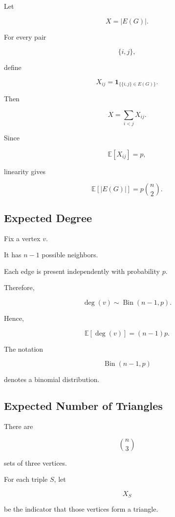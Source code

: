 Let

\[
X
=
|E(G)|.
\]

For every pair

\[
\{i,j\},
\]

define

\[
X_{ij}
=
\mathbf{1}_{\{\{i,j\}\in E(G)\}}.
\]

Then

\[
X
=
\sum_{i<j}X_{ij}.
\]

Since

\[
\mathbb{E}[X_{ij}]
=
p,
\]

linearity gives

\[
\boxed{
\mathbb{E}[|E(G)|]
=
p\binom{n}{2}.
}
\]

\subsection{Expected Degree}
\label{subsec:expected-degree-random-graph}

Fix a vertex \(v\).

It has \(n-1\) possible neighbors.

Each edge is present independently with probability \(p\).

Therefore,

\[
\deg(v)
\sim
\operatorname{Bin}(n-1,p).
\]

Hence,

\[
\boxed{
\mathbb{E}[\deg(v)]
=
(n-1)p.
}
\]

The notation

\[
\operatorname{Bin}(n-1,p)
\]

denotes a binomial distribution.

\subsection{Expected Number of Triangles}
\label{subsec:expected-triangles}

There are

\[
\binom{n}{3}
\]

sets of three vertices.

For each triple \(S\), let

\[
X_S
\]

be the indicator that those vertices form a triangle.

